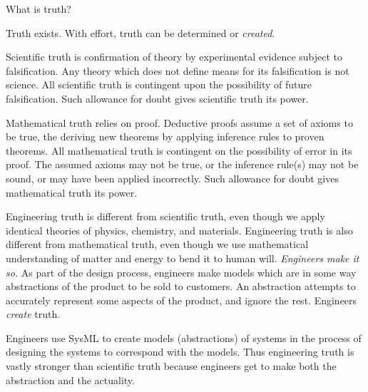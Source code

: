\pn What is truth? \cite{truth}


\pn Truth exists.  With effort, truth can be determined or \emph{created}.

\pn Scientific truth is confirmation of theory by experimental evidence subject to falsification.  Any theory which does not define means for its falsification is not science.   
All scientific truth is contingent upon the possibility of future falsification.  Such allowance for doubt gives scientific truth its power.

\pn Mathematical truth relies on proof.  Deductive proofs assume a set of axioms to be true, the deriving new theorems by applying inference rules to proven theorems.  All mathematical truth is contingent on the possibility of error in its proof.  The assumed axioms may not be true, or the inference rule(s) may not be sound, or may have been applied incorrectly.  Such allowance for doubt gives mathematical truth its power.

%
%
%

\pn Engineering truth  is different from scientific truth, even though we apply identical theories of physics, chemistry, and materials.  Engineering truth is also different from mathematical truth, even though we use mathematical understanding of matter and energy to bend it to human will.
\emph{Engineers make it so.}  As part of the design process, engineers make models which are in some way abstractions of the product to be sold to customers.  An abstraction attempts to accurately represent some aspects of the product, and ignore the rest.  Engineers \emph{create} truth.

\pn Engineers  use SysML to create models (abstractions) of systems in the process of designing the systems to correspond with the models.
Thus engineering truth is vastly stronger than scientific truth because engineers get to make both the abstraction and the actuality.

